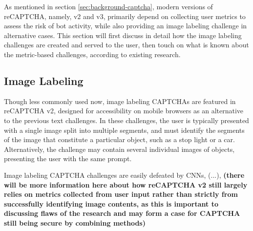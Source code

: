 \documentclass[sigplan,screen,nonacm]{acmart-tagged}
\begin{document}

As mentioned in section \ref{sec:background-captcha}, modern versions of reCAPTCHA, namely, v2 and v3, primarily depend on collecting user metrics to assess the risk of bot activity, while also providing an image labeling challenge in alternative cases. This section will first discuss in detail how the image labeling challenges are created and served to the user, then touch on what is known about the metric-based challenges, according to existing research.

\subsection{Image Labeling}
\label{sec:visual}

Though less commonly used now, image labeling CAPTCHAs are featured in reCAPTCHA v2, designed for accessibility on mobile browsers as an alternative to the previous text challenges. In these challenges, the user is typically presented with a single image split into multiple segments, and must identify the segments of the image that constitute a particular object, such as a stop light or a car. Alternatively, the challenge may contain several individual images of objects, presenting the user with the same prompt. 

Image labeling CAPTCHA challenges are easily defeated by CNNs, (...), \textbf{(there will be more information here about how reCAPTCHA v2 still largely relies on metrics collected from user input rather than strictly from successfully identifying image contents, as this is important to discussing flaws of the research and may form a case for CAPTCHA still being secure by combining methods)}


\end{document}

